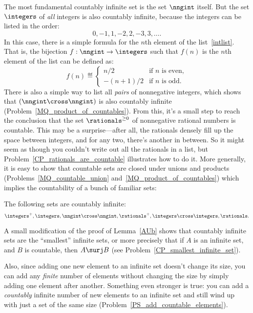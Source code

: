 The most fundamental countably infinite set is the set $\nngint$
itself.  But the set $\integers$ of \emph{all} integers is also
countably infinite, because the integers can be listed in the order:
\begin{equation}\label{intlist}
0,-1,1,-2,2,-3,3,\dots.
\end{equation}
In this case, there is a simple formula for the $n$th element of the
list~\eqref{intlist}.  That is, the bijection $f:\nngint \to
\integers$ such that $f(n)$ is the $n$th element of the list can be
defined as:
\[
f(n) \eqdef \begin{cases} n/2 & \text{if $n$ is even},\\ -(n+1)/2 &
  \text{if $n$ is odd}.
           \end{cases} 
\]    
There is also a simple way to list all \emph{pairs} of nonnegative
integers, which shows that $(\nngint \cross \nngint)$ is also
countably infinite (Problem~\ref{MQ_product_of_countables}).  From
this, it's a small step to reach the conclusion that the set
$\rationals^{\ge 0}$ of nonnegative rational numbers is countable.
This may be a surprise---after all, the rationals densely fill up the
space between integers, and for any two, there's another in between.
So it might seem as though you couldn't write out all the rationals in
a list, but Problem~\ref{CP_rationals_are_countable} illustrates how
to do it.  More generally, it is easy to show that countable sets are
closed under unions and products
(Problems~\ref{MQ_countable_union}
and~\ref{MQ_product_of_countables}) which implies the countability of
a bunch of familiar sets:
\begin{corollary}\label{countable_examples}
The following sets are countably infinite:
\[\integers^+, 
 \integers, \nngint \cross \nngint, \rationals^+, \integers \cross
 \integers, \rationals.
\]
\end{corollary}

A small modification of the proof of Lemma~\ref{AUb} shows that
countably infinite sets are the ``smallest'' infinite sets, or more
precisely that if $A$ is an infinite set, and $B$ is countable, then
$A \surj B$ (see Problem~\ref{CP_smallest_infinite_set}).

Also, since adding one new element to an infinite set doesn't change
its size, you can add any \emph{finite} number of elements without
changing the size by simply adding one element after another.
Something even stronger is true: you can add a \emph{countably}
infinite number of new elements to an infinite set and still wind up
with just a set of the same size
(Problem~\ref{PS_add_countable_elements}).

